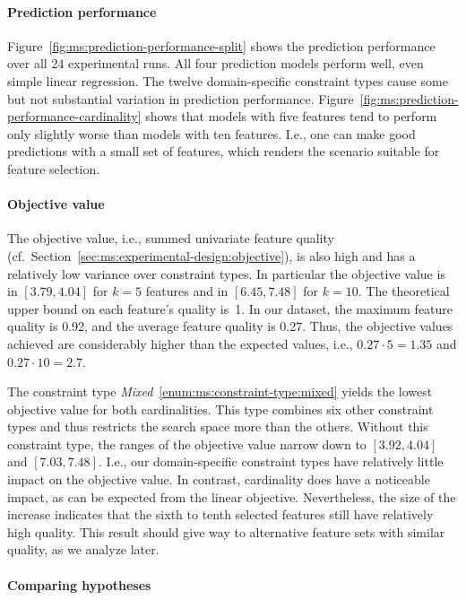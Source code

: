 \paragraph{Prediction performance}

Figure~\ref{fig:ms:prediction-performance-split} shows the prediction performance over all 24 experimental runs.
All four prediction models perform well, even simple linear regression.
The twelve domain-specific constraint types cause some but not substantial variation in prediction performance.
Figure~\ref{fig:ms:prediction-performance-cardinality} shows that models with five features tend to perform only slightly worse than models with ten features.
I.e., one can make good predictions with a small set of features, which renders the scenario suitable for feature selection.

\paragraph{Objective value}

The objective value, i.e., summed univariate feature quality (cf.~Section~\ref{sec:ms:experimental-design:objective}), is also high and has a relatively low variance over constraint types.
In particular the objective value is in $[3.79, 4.04]$ for $k=5$ features and in $[6.45, 7.48]$ for $k=10$.
The theoretical upper bound on each feature's quality is~1.
In our dataset, the maximum feature quality is 0.92, and the average feature quality is 0.27.
Thus, the objective values achieved are considerably higher than the expected values, i.e.,
$0.27\cdot 5=1.35$ and $0.27 \cdot 10=2.7$.

The constraint type \emph{Mixed}~\ref{enum:ms:constraint-type:mixed} yields the lowest objective value for both cardinalities.
This type combines six other constraint types and thus restricts the search space more than the others.
Without this constraint type, the ranges of the objective value narrow down to $[3.92, 4.04]$ and $[7.03, 7.48]$.
I.e., our domain-specific constraint types have relatively little impact on the objective value.
In contrast, cardinality does have a noticeable impact, as can be expected from the linear objective.
Nevertheless, the size of the increase indicates that the sixth to tenth selected features still have relatively high quality.
This result should give way to alternative feature sets with similar quality, as we analyze later.

\paragraph{Comparing hypotheses}

